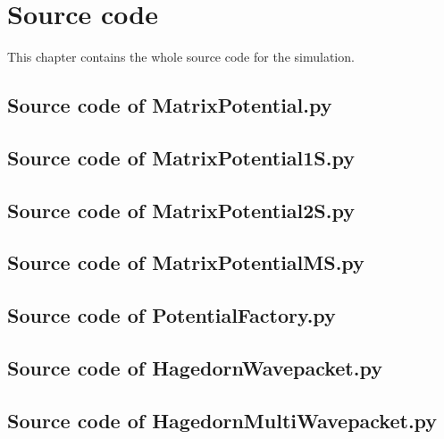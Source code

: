 \chapter{Source code}

This chapter contains the whole source code for the simulation.

\section{Source code of MatrixPotential.py}


\section{Source code of MatrixPotential1S.py}


\section{Source code of MatrixPotential2S.py}


\section{Source code of MatrixPotentialMS.py}


\section{Source code of PotentialFactory.py}


\section{Source code of HagedornWavepacket.py}


\section{Source code of HagedornMultiWavepacket.py}


